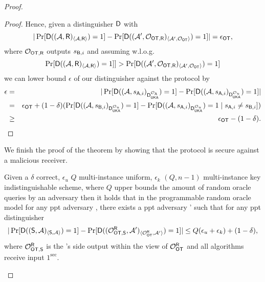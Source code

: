 \begin{proof}
\begin{proof}
Hence, given a distinguisher $\mathsf D$ with
$$
|\Pr[\mathsf D((\mathcal{A},\mathsf{R})_{\langle \mathcal{A}, \mathsf{R}\rangle})=1] -\Pr[ \mathsf D((\mathcal{A}',\mathcal{O}_{\mathsf{OT}, \mathsf{R}})_{\langle \mathcal{A}', \mathcal{O}_{\mathsf{OT}}\rangle})=1]|=\epsilon_{\mathsf{OT}},
$$
where $\mathcal{O}_{\mathsf{OT}, \mathsf{R}}$ outputs $s_{\mathsf{B},i}$
and assuming w.l.o.g. 
$$
\Pr[\mathsf D((\mathcal{A},\mathsf{R})_{\langle \mathcal{A}, \mathsf{R}\rangle})=1]]>\Pr[  \mathsf D((\mathcal{A}',\mathcal{O}_{\mathsf{OT}, \mathsf{R}})_{\langle \mathcal{A}', \mathcal{O}_{\mathsf{OT}}\rangle})=1]
$$
 we can lower bound $\epsilon$ of our distinguisher against the \UKA protocol by
\begin{eqnarray*}
\epsilon &=&|\Pr[\mathsf D((\mathcal{A},s_{\mathsf{A},i})_{\mathsf D_{\mathsf{UKA}}^{\mathcal{O}_{\mathsf{A}}}})=1] -\Pr[ \mathsf D((\mathcal{A},s_{\mathsf{A},i})_{\mathsf D_{\mathsf{UKA}}^{\mathcal{O}_{u}}})=1]|\\
&=& \epsilon_{\mathsf{OT}} +(1-\delta)(\Pr[ \mathsf D((\mathcal{A},s_{\mathsf{B},i})_{\mathsf D_{\mathsf{UKA}}^{\mathcal{O}_{u}}})=1]-\Pr[ \mathsf D((\mathcal{A},s_{\mathsf{A},i})_{\mathsf D_{\mathsf{UKA}}^{\mathcal{O}_{u}}})=1\mid s_{\mathsf{A},i}\neq s_{\mathsf{B},i}])\\
&\geq &\epsilon_{\mathsf{OT}}-(1-\delta).
\end{eqnarray*}
\end{proof}

We finish the proof of the theorem by showing that the \OT protocol is secure against a malicious receiver.
\begin{claim}\label{claim:malreceiver}
Given a $\delta$ correct, $\epsilon_u$ $Q$ multi-instance uniform, $\epsilon_k$ $(Q,n-1)$ multi-instance key indistinguishable  \UKA scheme, where $Q$ upper bounds the amount of random oracle queries by an adversary then it holds that in the programmable random oracle model for any ppt adversary \Adv, there exists a ppt adversary \Adv' such that for any ppt distinguisher \D
$$
|\Pr[\mathsf D((\mathsf{S}, \mathcal{A})_{\langle \mathsf{S}, \mathcal{A}\rangle})=1] -\Pr[\mathsf D((\mathcal{O}_{\mathsf{OT},\mathsf{S}}^\mathsf{R},\mathcal{A}')_{\langle \mathcal{O}_{\mathsf{OT}}^\mathsf{R} , \mathcal{A}' \rangle})=1]|\leq Q(\epsilon_{u}+\epsilon_{k})+(1-\delta),
$$
where $\mathcal{O}_{\mathsf{OT},\mathsf{S}}^\mathsf{R}$ is  the \send's side output within the view of $\mathcal{O}_{\mathsf{OT}}^\mathsf{R}$ and all algorithms receive input $1^\sec$.
\end{claim}



\end{proof}
